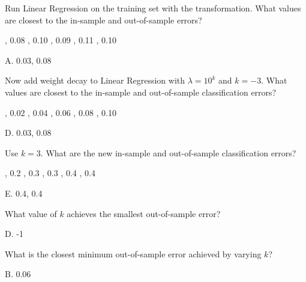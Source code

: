 \documentclass[answers]{exam}
\begin{document}
\begin{questions}
\setcounter{question}{1}
\question Run Linear Regression on the training set with the transformation. 
What values are closest to the in-sample and out-of-sample errors?
\begin{choices}
, 0.08
, 0.10
, 0.09
, 0.11
, 0.10
\end{choices}

\begin{verbatim*}
\end{verbatim*}

\begin{solution}
A. 0.03, 0.08
\end{solution}

\question Now add weight decay to Linear Regression with $\lambda = 10^k$ 
and $k = -3$. What values are closest to the in-sample and out-of-sample 
classification errors?
\begin{choices}
, 0.02
, 0.04
, 0.06
, 0.08
, 0.10
\end{choices}

\begin{solution}
D. 0.03, 0.08
\end{solution}

\question Use $k = 3$. What are the new in-sample and out-of-sample 
classification errors?
\begin{choices}
, 0.2
, 0.3
, 0.3
, 0.4
, 0.4
\end{choices}

\begin{solution}
E. 0.4, 0.4
\end{solution}

\question What value of $k$ achieves the smallest out-of-sample error?
\begin{choices}
\end{choices}

\begin{solution}
D. -1
\end{solution}

\question What is the closest minimum out-of-sample error achieved by 
varying $k$?
\begin{choices}
\end{choices}

\begin{solution}
B. 0.06
\end{solution}
\end{questions}
\end{document}
